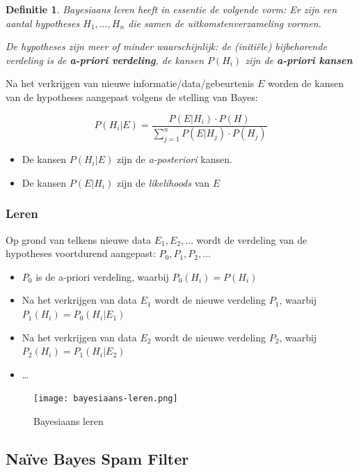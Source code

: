 \documentclass{article}
\newtheorem{theorem}{Definitie}[section]
\begin{document}
\begin{theorem}
    Bayesiaans leren heeft in essentie de volgende vorm: Er zijn een aantal hypotheses $H_1, \dots, H_n$ die samen de uitkomstenverzameling vormen.

    De hypotheses zijn meer of minder waarschijnlijk: de (initiële) bijbehorende verdeling is de \textbf{a-priori verdeling}, de kansen
    $P(H_i)$ zijn de \textbf{a-priori kansen}
\end{theorem}

Na het verkrijgen van nieuwe informatie/data/gebeurtenis $E$ worden de kansen van de hypotheses aangepast volgens de stelling van Bayes:

\begin{equation}
    P(H_i | E) = \frac{P(E | H_i) \cdot P(H)}{\sum_{j=1}^n P(E | H_j) \cdot P(H_j)}
\end{equation}


\begin{itemize}
    \item De kansen $P(H_i | E)$ zijn de \textit{a-posteriori} kansen. 
    \item De kansen $P(E | H_i)$ zijn de \textit{likelihoods} van $E$
\end{itemize}

\subsubsection{Leren}

Op grond van telkens nieuwe data $E_1, E_2, \dots$ wordt de verdeling van de hypotheses voortdurend aangepast: $P_0, P_1, P_2, \dots$

\begin{itemize}
    \item $P_0$ is de a-priori verdeling, waarbij $P_0(H_i) = P(H_i)$
    \item Na het verkrijgen van data $E_1$ wordt de nieuwe verdeling $P_1$, waarbij $P_1(H_i) = P_0(H_i | E_1)$
    \item Na het verkrijgen van data $E_2$ wordt de nieuwe verdeling $P_2$, waarbij $P_2(H_i) = P_1(H_i | E_2)$
    \item \dots
\end{itemize}


\begin{figure}[H]
    \centering
    \texttt{[image: bayesiaans-leren.png]}
    \caption{Bayesiaans leren}
\end{figure}


\subsection{Naïve Bayes Spam Filter}
\end{document}
